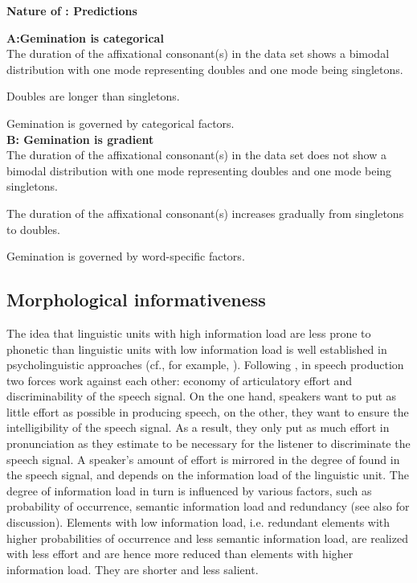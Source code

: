 {{\noindent \textbf{Nature of : Predictions}\\	\label{predictions nature of gemination}

\noindent \textbf{A:\hspace{0.5cm}Gemination is categorical} \\



\noindent	The duration of the affixational consonant(s) in the data set shows a bimodal distribution with one mode representing doubles and one mode being singletons.
	
\noindent	Doubles are longer than singletons. 
	
\noindent	Gemination is governed by categorical factors.	\\



\noindent	\textbf{B: \hspace{0.5cm}Gemination is gradient} \\
		
\noindent	The duration of the affixational consonant(s) in the data set does not show a bimodal distribution with one mode representing doubles and one mode being singletons. 

\noindent	The duration of the affixational consonant(s) increases gradually from singletons to doubles.  
	
\noindent	Gemination is governed by word-specific factors.
	



\subsection{Morphological informativeness} \label{morphological informativeness}

The idea that linguistic units with high information load are less prone to phonetic  than linguistic units with low information load is well established in psycholinguistic approaches  (cf., for example, \citealt{Aylett.2004,Kuperman.2007,Pluymaekers.2010,Hanique.2012}). Following \cite{Lindblom.1990}, in speech production two forces work against each other: economy of articulatory effort and discriminability of the speech signal. On the one hand, speakers want to put as little effort as possible in producing speech, on the other, they want to ensure the intelligibility of the speech signal. As a result, they only put as much effort in pronunciation as they estimate to be necessary for the listener to discriminate the speech signal. A speaker's amount of effort is mirrored in the degree of  found in the speech signal, and depends on the information load of the linguistic unit. The degree of information load in turn is influenced by various factors, such as probability of occurrence, semantic information load and redundancy (see also \cite{Kuperman.2007} for discussion).  
Elements with low information load, i.e. redundant elements with higher probabilities of occurrence and less semantic information load, are realized with less effort and are hence more reduced than elements with higher information load. They are shorter and less salient. 

}}
